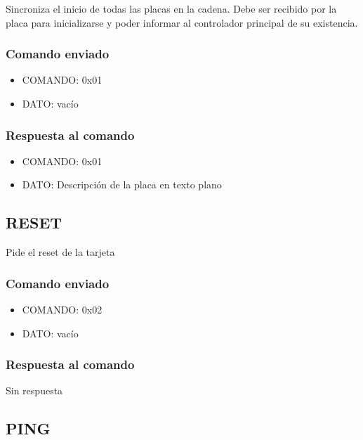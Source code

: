 \documentclass[a4paper,10pt]{article}
\begin{document}
Sincroniza el inicio de todas las placas en la cadena.
Debe ser recibido por la placa para inicializarse y poder informar al controlador principal de su existencia.

\subsubsection*{Comando enviado}
\label{init_comando_enviado}

\begin{itemize}
	\item{COMANDO:} 0x01
	\item{DATO:} vac\'io
\end{itemize}

\subsubsection*{Respuesta al comando}
\label{init_respuesta}

\begin{itemize}
	\item{COMANDO:} 0x01
	\item{DATO:} Descripci\'on de la placa en texto plano
\end{itemize}

\subsection{RESET}
\label{reset}

Pide el reset de la tarjeta

\subsubsection*{Comando enviado}
\label{reset_comando_enviado}

\begin{itemize}
	\item{COMANDO:} 0x02
	\item{DATO:} vac\'io
\end{itemize}

\subsubsection*{Respuesta al comando}
\label{reset_respuesta}

Sin respuesta

\subsection{PING}
\label{ping}
\end{document}
